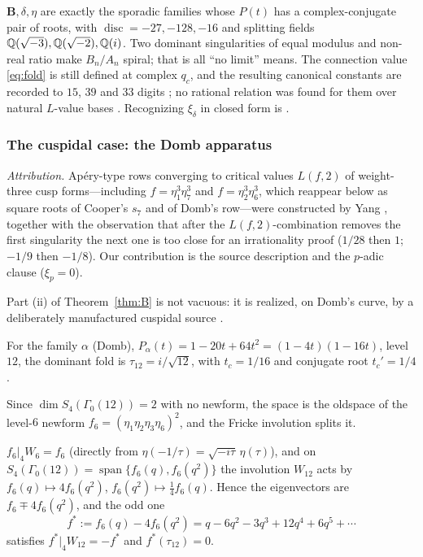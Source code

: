 \begin{remark}\label{rem:complexfold}
\Proved{} $\mathbf B,\delta,\eta$ are exactly the sporadic families whose
$P(t)$ has a complex-conjugate pair of roots, with
$\operatorname{disc}=-27,-128,-16$ and splitting fields
$\mathbb{Q}(\sqrt{-3}),\mathbb{Q}(\sqrt{-2}),\mathbb{Q}(i)$.  Two dominant singularities of equal
modulus and non-real ratio make $B_n/A_n$ spiral; that is all ``no limit''
means.  The connection value \eqref{eq:fold} is still defined at complex
$q_c$, and the resulting canonical constants are recorded to $15$, $39$ and
$33$ digits ; no rational relation was
found for them over natural $L$-value bases
.  Recognizing
$\xi_\delta$ in closed form is \Open{} \cite[Prob.~$\Phi$-1]{ProjSources}.
\end{remark}

\subsubsection*{The cuspidal case: the Domb apparatus}
\emph{Attribution.} Ap\'ery-type rows converging to critical values $L(f,2)$ of weight-three cusp forms---including $f=\eta_1^3\eta_7^3$ and $f=\eta_2^3\eta_6^3$, which reappear below as square roots of Cooper's $s_7$ and of Domb's row---were constructed by Yang \cite{Yang2007}, together with the observation that after the $L(f,2)$-combination removes the first singularity the next one is too close for an irrationality proof ($1/28$ then $1$; $-1/9$ then $-1/8$). Our contribution is the source description and the $p$-adic clause ($\xi_p=0$).


Part (ii) of Theorem~\ref{thm:B} is not vacuous: it is realized, on Domb's
curve, by a deliberately manufactured cuspidal source \cite{ProjDomb}.

\begin{proposition}
\label{prop:dombfold}
\Proved{} For the family $\alpha$ (Domb), $P_\alpha(t)=1-20t+64t^2=(1-4t)(1-16t)$,
level $12$, the dominant fold is $\tau_{12}=i/\sqrt{12}$, with
$t_c=1/16$ and conjugate root $t_c'=1/4$.
\end{proposition}

Since $\dim S_4(\Gamma_0(12))=2$ with no newform, the space is the oldspace of
the level-$6$ newform $f_6=(\eta_1\eta_2\eta_3\eta_6)^2$, and the Fricke
involution splits it.

\begin{theorem}
\label{thm:oldspace}
\Proved{} $f_6|_4W_6=f_6$ (directly from
$\eta(-1/\tau)=\sqrt{-i\tau}\,\eta(\tau)$), and on
$S_4(\Gamma_0(12))=\operatorname{span}\{f_6(q),f_6(q^2)\}$ the involution
$W_{12}$ acts by $f_6(q)\mapsto4f_6(q^2)$, $f_6(q^2)\mapsto\tfrac14f_6(q)$.
Hence the eigenvectors are $f_6\mp4f_6(q^2)$, and the odd one
\[
f^*:=f_6(q)-4f_6(q^2)=q-6q^2-3q^3+12q^4+6q^5+\cdots
\]
satisfies $f^*|_4W_{12}=-f^*$ and $f^*(\tau_{12})=0$.
\end{theorem}

